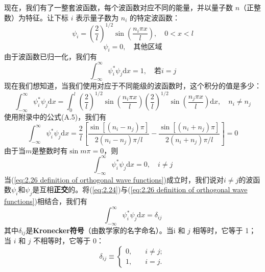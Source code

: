 	\indent 现在，我们有了一整套波函数，每个波函数对应不同的能量，并以量子数 $n$（正整数）为特征。让下标 $i$ 表示量子数为 $n_i$ 的特定波函数：
	\begin{equation*}
			\psi_i = \left(\frac{2}{l}\right)^{1/2} \sin\left(\frac{n_i\pi x}{l}\right), \quad  0<x<l
	\end{equation*}
	\begin{equation*}
		\psi_i = 0, \quad  \text{其他区域}
	\end{equation*}
	由于波函数已归一化，我们有
	\begin{equation}
		\int_{-\infty}^{\infty}\psi_i^{\ast} \psi_j \mathrm{d}x = 1, \quad \text{若}i=j
		\label{eq:2.24}
	\end{equation}
	现在我们想知道，当我们使用对应于不同能级的波函数时，这个积分的值是多少：
	\begin{equation*}
		\int_{-\infty}^{\infty}\psi_i^{\ast} \psi_j \mathrm{d}x = \int_{0}^{l}\left(\frac{2}{l}\right)^{1/2}\sin\left(\frac{n_i\pi x}{l}\right)\left(\frac{2}{l}\right)^{1/2}\sin\left(\frac{n_j\pi x}{l}\right)\mathrm{d}x, \quad n_i \neq n_j
	\end{equation*}
	使用附录中的公式(A.5)，我们有
	\begin{equation}
		\int_{-\infty}^{\infty}\psi_i^{\ast} \psi_j \mathrm{d}x = \frac{2}{l}\left[
			\frac{\sin \left[\left(n_i-n_j\right)\pi\right]}{2\left(n_i-n_j\right)\pi /l}- \frac{\sin \left[\left(n_i+n_j\right)\pi\right]}{2\left(n_i+n_j\right)\pi /l}
		\right] = 0
		\label{eq:2.25}
	\end{equation}
	由于当$m$是整数时有$\sin m \pi = 0$，则
	\begin{equation}
		\int_{-\infty}^{\infty}\psi_i^{\ast} \psi_j \mathrm{d}x = 0, \quad i \neq j
		\label{eq:2.26 definition of orthogonal wave functions}
	\end{equation}
	当(\ref{eq:2.26 definition of orthogonal wave functions})成立时，我们说对$i \neq j$的波函数$\psi_i$和$\psi_j$是互相\textbf{正交}的。将(\ref{eq:2.24})与(\ref{eq:2.26 definition of orthogonal wave functions})相结合，我们有
	\begin{equation}
		\int_{-\infty}^{\infty}\psi_i^{\ast} \psi_j \mathrm{d}x = \delta_{ij}
		\label{eq:2.27 orthogonal with kronecker delta}
	\end{equation}
	其中$\delta_{ij}$是\textbf{Kronecker符号}（由数学家的名字命名）。当$ $i 和 $j$ 相等时，它等于 1；当 $i$ 和 $j$ 不相等时，它等于 0：
	\begin{equation}
		\boxed{
			\delta_{ij} \equiv \begin{cases}
				0, \quad & i \neq j; \\
				1, \quad & i = j.
			\end{cases}
		}
		\label{eq:2.28 definition of kronecker delta}
	\end{equation}
